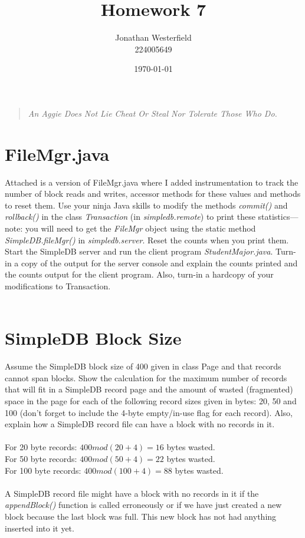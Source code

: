 \documentclass [letter,12pt] {article}
\begin{document}
\title{
    \huge{\textbf{Homework 7}}
}
\author{
    Jonathan Westerfield \\
    224005649
}
\date{\today}
\maketitle

\begin{quote}
\centering
\textit {
    An Aggie Does Not Lie Cheat Or Steal Nor Tolerate Those Who Do. \\
}
\vspace {1.4in}
\hrulefill
\end{quote}
\newpage

\section{FileMgr.java}
    Attached is a version of FileMgr.java where I added instrumentation 
    to track the number of block reads and writes, accessor methods for 
    these values and methods to reset them. Use your ninja Java skills 
    to modify the methods \textit{commit()} and \textit{rollback()} in 
    the class \textit{Transaction} 
    (in \textit{simpledb.remote}) to print these statistics—note: you will need to 
    get the \textit{FileMgr} object using the static method \textit{SimpleDB.fileMgr()} in
    \textit{simpledb.server}. Reset the counts when you print them. Start the 
    SimpleDB server and run the client program \textit{StudentMajor.java}. Turn-in
    a copy of the output for the server console and explain the counts 
    printed and the counts output for the client program. Also, turn-in a 
    hardcopy of your modifications to Transaction.
    \\
    \\

\section{SimpleDB Block Size}
    Assume the SimpleDB block size of 400 given in class Page and that records
    cannot span blocks. Show the calculation for the maximum number of records
    that will fit in a SimpleDB record page and the amount of wasted 
    (fragmented) space in the page for each of the following record sizes
    given in bytes: 20, 50 and 100 (don’t forget to include the 4-byte 
    empty/in-use flag for each record). Also, explain how a SimpleDB record 
    file can have a block with no records in it.
    \\
    \\
    For 20 byte records: \(400 mod(20 + 4)=16\) bytes wasted.\\
    For 50 byte records: \(400 mod(50 + 4)=22\) bytes wasted.\\
    For 100 byte records: \(400 mod(100 + 4)=88\) bytes wasted.\\
    \\
    A SimpleDB record file might have a block with no records in it if
    the \textit{appendBlock()} function is called erroneously or if we
    have just created a new block because the last block was full. 
    This new block has not had anything inserted into it yet.
\end{document}

